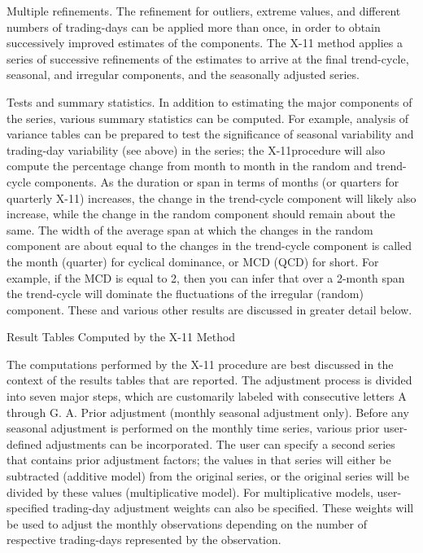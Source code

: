 Multiple refinements. The refinement for outliers, extreme values, and different numbers of trading-days can be applied more than once, in order to obtain successively improved estimates of the components. The X-11 method applies a series of successive refinements of the estimates to arrive at the final trend-cycle, seasonal, and irregular components, and the seasonally adjusted series.

Tests and summary statistics. In addition to estimating the major components of the series, various summary statistics can be computed. For example, analysis of variance tables can be prepared to test the significance of seasonal variability and trading-day variability (see above) in the series; the X-11procedure will also compute the percentage change from month to month in the random and trend-cycle components. As the duration or span in terms of months (or quarters for quarterly X-11) increases, the change in the trend-cycle component will likely also increase, while the change in the random component should remain about the same. The width of the average span at which the changes in the random component are about equal to the changes in the trend-cycle component is called the month (quarter) for cyclical dominance, or MCD (QCD) for short. For example, if the MCD is equal to 2, then you can infer that over a 2-month span the trend-cycle will dominate the fluctuations of the irregular (random) component. These and various other results are discussed in greater detail below.

Result Tables Computed by the X-11 Method

The computations performed by the X-11 procedure are best discussed in the context of the results tables that are reported. The adjustment process is divided into seven major steps, which are customarily labeled with consecutive letters A through G.
A.
Prior adjustment (monthly seasonal adjustment only). Before any seasonal adjustment is performed on the monthly time series, various prior user- defined adjustments can be incorporated. The user can specify a second series that contains prior adjustment factors; the values in that series will either be subtracted (additive model) from the original series, or the original series will be divided by these values (multiplicative model). For multiplicative models, user-specified trading-day adjustment weights can also be specified. These weights will be used to adjust the monthly observations depending on the number of respective trading-days represented by the observation.

